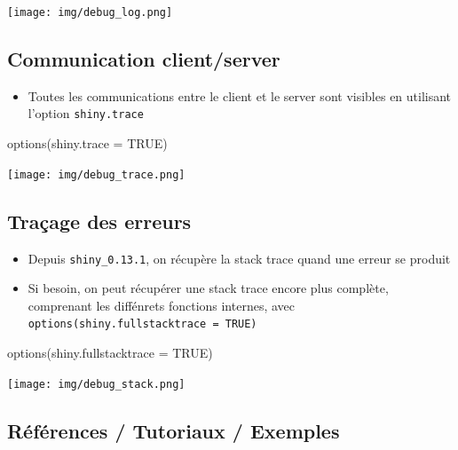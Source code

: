 \documentclass[
]{article}
\newenvironment{Shaded}{\begin{snugshade}}{\end{snugshade}}
\newcommand{\AttributeTok}[1]{\textcolor[rgb]{0.77,0.63,0.00}{#1}}
\newcommand{\ConstantTok}[1]{\textcolor[rgb]{0.00,0.00,0.00}{#1}}
\newcommand{\FunctionTok}[1]{\textcolor[rgb]{0.00,0.00,0.00}{#1}}
\newcommand{\NormalTok}[1]{#1}
\providecommand{\tightlist}{%
  \setlength{\itemsep}{0pt}\setlength{\parskip}{0pt}}
\begin{document}
\texttt{[image: img/debug\_log.png]}

\hypertarget{communication-clientserver}{%
\subsection{Communication
client/server}\label{communication-clientserver}}

\begin{itemize}
\tightlist
\item
  Toutes les communications entre le client et le server sont visibles
  en utilisant l'option \texttt{shiny.trace}
\end{itemize}

\begin{Shaded}
\begin{Highlighting}[]
\FunctionTok{options}\NormalTok{(}\AttributeTok{shiny.trace =} \ConstantTok{TRUE}\NormalTok{) }
\end{Highlighting}
\end{Shaded}

\texttt{[image: img/debug\_trace.png]}

\hypertarget{trauxe7age-des-erreurs}{%
\subsection{Traçage des erreurs}\label{trauxe7age-des-erreurs}}

\begin{itemize}
\tightlist
\item
  Depuis \texttt{shiny\_0.13.1}, on récupère la stack trace quand une
  erreur se produit
\item
  Si besoin, on peut récupérer une stack trace encore plus complète,
  comprenant les diffénrets fonctions internes, avec
  \texttt{options(shiny.fullstacktrace\ =\ TRUE)}
\end{itemize}

\begin{Shaded}
\begin{Highlighting}[]
\FunctionTok{options}\NormalTok{(}\AttributeTok{shiny.fullstacktrace =} \ConstantTok{TRUE}\NormalTok{)}
\end{Highlighting}
\end{Shaded}

\texttt{[image: img/debug\_stack.png]}

\hypertarget{ruxe9fuxe9rences-tutoriaux-exemples}{%
\subsection{Références / Tutoriaux /
Exemples}\label{ruxe9fuxe9rences-tutoriaux-exemples}}
\end{document}
